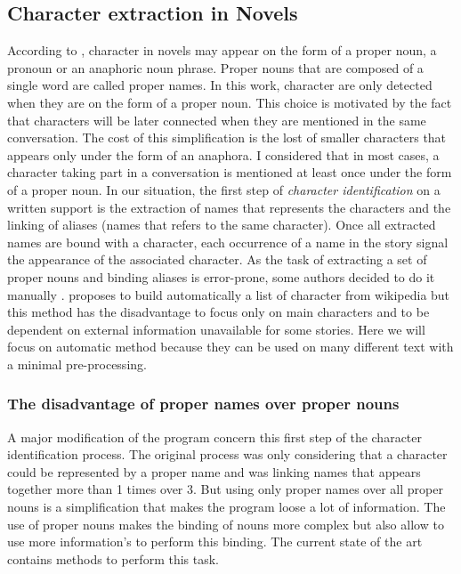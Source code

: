 \documentclass[a4paper, 12pt]{report}
\begin{document}
\subsection{Character extraction in Novels}
According to \cite{fiction},  character in novels may appear on the form of a proper noun, a pronoun or an anaphoric noun phrase. Proper nouns that are composed of a single word are called proper names. In this work, character are only detected when they are on the form of a proper noun. This choice is motivated by the fact that characters will be later connected when they are mentioned in the same conversation. The cost of this simplification is the lost of smaller characters that appears only under the form of an anaphora. I considered that in most cases, a character taking part in a conversation is mentioned at least once under the form of a proper noun. In our situation, the first step of \textit{character identification} on a written support is the extraction of names that represents the characters and the linking of aliases (names that refers to the same character). Once all extracted names are bound with a character, each occurrence of a name in the story signal the appearance of the associated character. As the task of extracting a set of proper nouns and binding aliases is error-prone, some authors decided to do it manually \citep{agarwal-etal-2013-automatic}.  \cite{he-etal-2013-identification} proposes to build automatically a list of character from wikipedia but this method has the disadvantage to focus only on main characters and to be dependent on external information unavailable for some stories.  Here we will focus on automatic method because they can be used on many different text with a minimal pre-processing.\\

\subsubsection{The disadvantage of proper names over proper nouns}
A major modification of the program concern this first step of the character identification process. The original process was only considering that a character could be represented by a proper name and was linking names that appears together more than 1 times over 3. But using only proper names over all proper nouns is a simplification that makes the program loose a lot of information. The use of proper nouns makes the binding of nouns more complex but also allow to use more information's to perform this binding. The current state of the art contains methods to perform this task. \\
\end{document}
